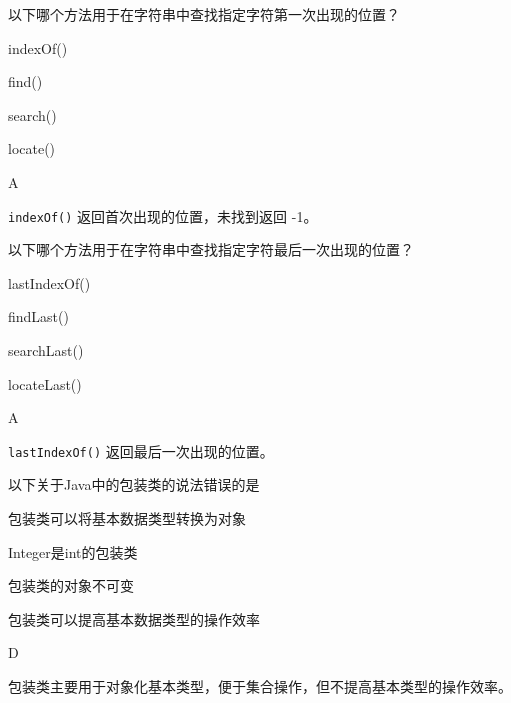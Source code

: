 \begin{question}
	以下哪个方法用于在字符串中查找指定字符第一次出现的位置？
	\begin{options}
		\item indexOf()
		\item find()
		\item search()
		\item locate()
	\end{options}
	\begin{answer}
		A
	\end{answer}
	\begin{explanation}
		\texttt{indexOf()} 返回首次出现的位置，未找到返回 -1。
	\end{explanation}
\end{question}

\begin{question}
	以下哪个方法用于在字符串中查找指定字符最后一次出现的位置？
	\begin{options}
		\item lastIndexOf()
		\item findLast()
		\item searchLast()
		\item locateLast()
	\end{options}
	\begin{answer}
		A
	\end{answer}
	\begin{explanation}
		\texttt{lastIndexOf()} 返回最后一次出现的位置。
	\end{explanation}
\end{question}

\begin{question}
	以下关于Java中的包装类的说法错误的是
	\begin{options}
		\item 包装类可以将基本数据类型转换为对象
		\item Integer是int的包装类
		\item 包装类的对象不可变
		\item 包装类可以提高基本数据类型的操作效率
	\end{options}
	\begin{answer}
		D
	\end{answer}
	\begin{explanation}
		包装类主要用于对象化基本类型，便于集合操作，但不提高基本类型的操作效率。
	\end{explanation}
\end{question}


